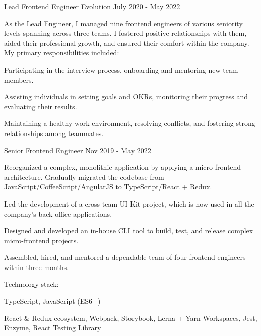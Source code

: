\begin{cventries}
  \cventry
    {Lead Frontend Engineer} %
    {Evolution} %
    {} %
    {July 2020 - May 2022} %
    {
      As the Lead Engineer, I managed nine frontend engineers of various seniority levels spanning across three teams. I fostered positive relationships with them, aided their professional growth, and ensured their comfort within the company.
      \newline
      \vspace{2mm}
      My primary responsibilities included:
      \vspace{4mm}
      \begin{cvitems}
        \item Participating in the interview process, onboarding and mentoring new team members.
        \item Assisting individuals in setting goals and OKRs, monitoring their progress and evaluating their results.
        \item Maintaining a healthy work environment, resolving conflicts, and fostering strong relationships among teammates.
      \end{cvitems}
    }

  \cventry
    {Senior Frontend Engineer} %
    {} %
    {} %
    {Nov 2019 - May 2022} %
    {
      \begin{cvitems} 
        \item Reorganized a complex, monolithic application by applying a micro-frontend architecture. Gradually migrated the codebase from JavaScript/CoffeeScript/AngularJS to TypeScript/React + Redux.
        \item Led the development of a cross-team UI Kit project, which is now used in all the company’s back-office applications.
        \item Designed and developed an in-house CLI tool to build, test, and release complex micro-frontend projects.
        \item Assembled, hired, and mentored a dependable team of four frontend engineers within three months.
      \end{cvitems}
      \vspace{5mm}
      Technology stack:
      \begin{cvstackitems}
        \item TypeScript, JavaScript (ES6+)
        \item React \& Redux ecosystem, Webpack, Storybook, Lerna + Yarn Workspaces, Jest, Enzyme, React Testing Library
      \end{cvstackitems}
      \vspace{-2.0mm}
    }


\end{cventries}
